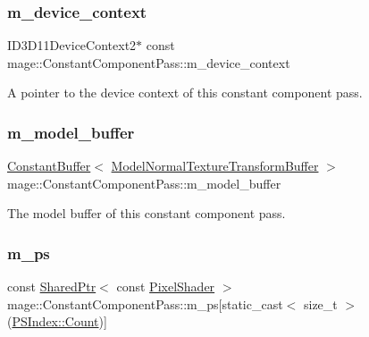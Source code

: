 \subsubsection{\texorpdfstring{m\+\_\+device\+\_\+context}{m\_device\_context}}
{\footnotesize\ttfamily I\+D3\+D11\+Device\+Context2$\ast$ const mage\+::\+Constant\+Component\+Pass\+::m\+\_\+device\+\_\+context\hspace{0.3cm}{\ttfamily [private]}}

A pointer to the device context of this constant component pass. \hypertarget{classmage_1_1_constant_component_pass_a012197b5473955c356d2fbc48f9d3e8b}{}\label{classmage_1_1_constant_component_pass_a012197b5473955c356d2fbc48f9d3e8b} 
\subsubsection{\texorpdfstring{m\+\_\+model\+\_\+buffer}{m\_model\_buffer}}
{\footnotesize\ttfamily \hyperlink{structmage_1_1_constant_buffer}{Constant\+Buffer}$<$ \hyperlink{structmage_1_1_model_normal_texture_transform_buffer}{Model\+Normal\+Texture\+Transform\+Buffer} $>$ mage\+::\+Constant\+Component\+Pass\+::m\+\_\+model\+\_\+buffer\hspace{0.3cm}{\ttfamily [private]}}

The model buffer of this constant component pass. \hypertarget{classmage_1_1_constant_component_pass_a932366be8feba629aa2dd29a844e38b8}{}\label{classmage_1_1_constant_component_pass_a932366be8feba629aa2dd29a844e38b8} 
\subsubsection{\texorpdfstring{m\+\_\+ps}{m\_ps}}
{\footnotesize\ttfamily const \hyperlink{namespacemage_a1e01ae66713838a7a67d30e44c67703e}{Shared\+Ptr}$<$ const \hyperlink{namespacemage_a27ecaf266420ee7a494d64edc0757129}{Pixel\+Shader} $>$ mage\+::\+Constant\+Component\+Pass\+::m\+\_\+ps\mbox{[}static\+\_\+cast$<$ size\+\_\+t $>$(\hyperlink{classmage_1_1_constant_component_pass_a5700234587f2aa0ebdb4f7790704f00bae93f994f01c537c4e2f7d8528c3eb5e9}{P\+S\+Index\+::\+Count})\mbox{]}\hspace{0.3cm}{\ttfamily [private]}}

